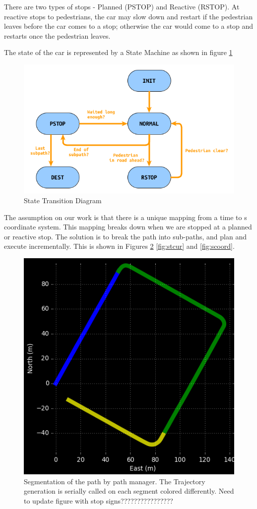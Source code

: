 \documentclass[letterpaper, 10 pt, conference]{ieeeconf}  %
\begin{document}
There are two types of stops - Planned (PSTOP) and Reactive (RSTOP). At reactive stops
to pedestrians, the car may slow down and restart if the pedestrian leaves before the
car comes to a stop; otherwise the car would come to a stop and restarts once the 
pedestrian leaves.

The state of the car is represented by a State Machine as shown in figure \ref{fig:st}

\begin{figure}[thpb]
  \centering
  \includegraphics[width=1.0\columnwidth]{graphics/StateMachineSimple.png}
  \caption{State Transition Diagram}
  \label{fig:st}
\end{figure}


The assumption on our work is that there is a unique mapping from a time to s coordinate 
system. This mapping breaks down when we are stopped at a planned or reactive stop. 
The solution is to break the path into sub-paths, and plan and execute incrementally.
This is shown in Figures \ref{fig:segmentation} \ref{fig:stcur} and \ref{fig:scoord}.

\begin{figure}[thpb]
  \centering
  \includegraphics[width=0.5\columnwidth]{graphics/Subpaths.png}
  \caption{Segmentation of the path by path manager. The Trajectory generation is serially called on each segment colored differently. Need to update figure with stop signs????????????????}
  \label{fig:segmentation}
\end{figure}
\end{document}
